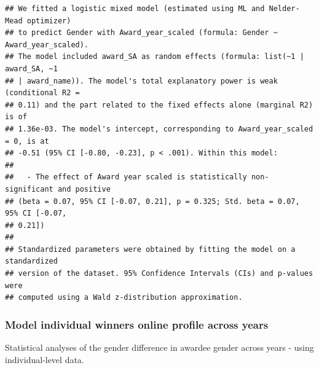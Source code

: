 \documentclass[
]{article}
\newenvironment{Shaded}{\begin{snugshade}}{\end{snugshade}}
\newcommand{\AttributeTok}[1]{\textcolor[rgb]{0.77,0.63,0.00}{#1}}
\newcommand{\CommentTok}[1]{\textcolor[rgb]{0.56,0.35,0.01}{\textit{#1}}}
\newcommand{\DecValTok}[1]{\textcolor[rgb]{0.00,0.00,0.81}{#1}}
\newcommand{\FunctionTok}[1]{\textcolor[rgb]{0.00,0.00,0.00}{#1}}
\newcommand{\NormalTok}[1]{#1}
\newcommand{\OtherTok}[1]{\textcolor[rgb]{0.56,0.35,0.01}{#1}}
\newcommand{\SpecialCharTok}[1]{\textcolor[rgb]{0.00,0.00,0.00}{#1}}
\newcommand{\StringTok}[1]{\textcolor[rgb]{0.31,0.60,0.02}{#1}}
\begin{document}
\begin{verbatim}
## We fitted a logistic mixed model (estimated using ML and Nelder-Mead optimizer)
## to predict Gender with Award_year_scaled (formula: Gender ~ Award_year_scaled).
## The model included award_SA as random effects (formula: list(~1 | award_SA, ~1
## | award_name)). The model's total explanatory power is weak (conditional R2 =
## 0.11) and the part related to the fixed effects alone (marginal R2) is of
## 1.36e-03. The model's intercept, corresponding to Award_year_scaled = 0, is at
## -0.51 (95% CI [-0.80, -0.23], p < .001). Within this model:
## 
##   - The effect of Award year scaled is statistically non-significant and positive
## (beta = 0.07, 95% CI [-0.07, 0.21], p = 0.325; Std. beta = 0.07, 95% CI [-0.07,
## 0.21])
## 
## Standardized parameters were obtained by fitting the model on a standardized
## version of the dataset. 95% Confidence Intervals (CIs) and p-values were
## computed using a Wald z-distribution approximation.
\end{verbatim}

\hypertarget{model-individual-winners-online-profile-across-years}{%
\subsubsection{Model individual winners online profile across
years}\label{model-individual-winners-online-profile-across-years}}

Statistical analyses of the gender difference in awardee gender across
years - using individual-level data.

\begin{Shaded}
\end{Shaded}
\end{document}

